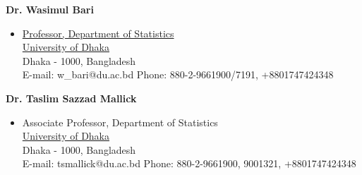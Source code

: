 \documentclass[10pt]{article}
\newenvironment{innerlist}[1][\enskip\textbullet]%
	{\begin{itemize}[#1,leftmargin=*,parsep=0pt,itemsep=0pt,topsep=0pt,partopsep=0pt]}
		{\end{itemize}}
\newcommand{\halfblankline}{\quad\vspace{-0.5\baselineskip}\pagebreak[3]}
\begin{document}
\halfblankline

{\bf Dr. Wasimul Bari}
\begin{innerlist}
	\item[]  \href{http://www.du.ac.bd/faculty/faculty_details/STA/217} {Professor, Department of Statistics} \\
	\href{http://www.du.ac.bd/} {University of Dhaka}\\
	Dhaka - 1000, Bangladesh \\
    E-mail: w\_bari@du.ac.bd  \hfill {Phone: 880-2-9661900/7191, +8801747424348}
\end{innerlist}

\halfblankline

{\bf Dr. Taslim Sazzad Mallick}
\begin{innerlist}
	\item[] Associate Professor, {Department of Statistics} \\
	\href{http://www.du.ac.bd/} {University of Dhaka}\\
	Dhaka - 1000, Bangladesh \\
    E-mail: tsmallick@du.ac.bd  \hfill {Phone: 880-2-9661900, 9001321, +8801747424348}
\end{innerlist}
\end{document}
